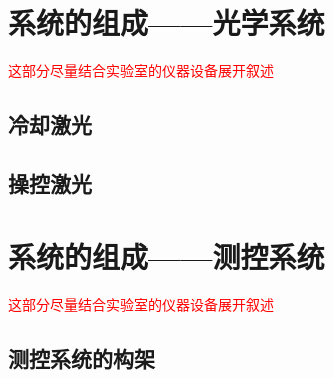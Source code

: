 \section[系统的组成——光学系统]{系统的组成——光学系统}
\textcolor{red}{这部分尽量结合实验室的仪器设备展开叙述}

\subsection[冷却激光]{冷却激光}

\subsection[操控激光]{操控激光}






\section[系统的组成——测控系统]{系统的组成——测控系统}
\textcolor{red}{这部分尽量结合实验室的仪器设备展开叙述}
\subsection[测控系统的构架]{测控系统的构架}

